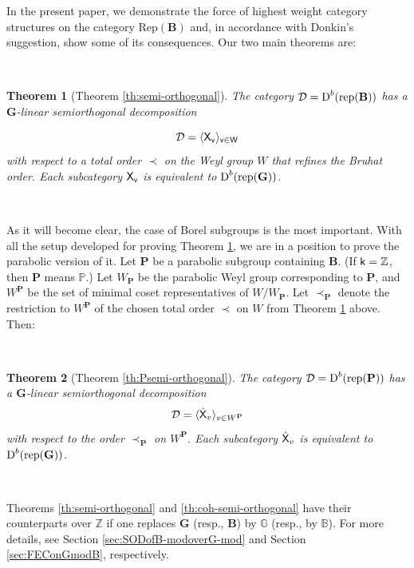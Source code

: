 \documentclass[sn-mathphys-num]{sn-jnl}%
\newcommand{\D}{\mathcal D}
\newcommand{\rep}{{\mathrm{rep}}}
\newcommand{\Rep}{{\mathrm{Rep}}}
\newcommand*{\Dd}{\mathop{\mathrm D\kern0pt}\nolimits}
\newcommand{\sk}{{\sf k}}
\newcommand{\Gm}{\mathbb G}
\newcommand{\Bm}{\mathbb B}
\newcommand{\Z}{{\mathbb Z}}
\newcommand{\bg}{\mathbf G}
\newcommand{\fb}{\mathbf B}
\newcommand{\bp}{\mathbf P}
\newtheorem{theorem}{Theorem}[section]
\theoremstyle{definition}
\begin{document}
In the present paper, we demonstrate the force of highest weight category structures on the category $\Rep(\fb)$ and, in accordance with Donkin's suggestion, show some of its consequences. Our two main theorems are:

\

\begin{theorem}[Theorem \ref{th:semi-orthogonal}]\label{th:1}
The category $\D=\Dd^b (\rep ({\fb}))$ has a $ \bg$-linear semiorthogonal decomposition 

\begin{equation}
\D= \langle \sf X _v\rangle _{v\in W}
\end{equation}
with respect to  a total order $\prec$ on the Weyl group $W$ that refines the Bruhat order. Each subcategory $\sf X _v$ is equivalent to $\Dd ^b(\rep( \bg))$.
\end{theorem}

\

As it will become clear, the case of Borel subgroups is the most important. With all the setup developed for proving Theorem \ref{th:1}, we are in a position to prove the parabolic version of it. Let $\bp$ be a parabolic subgroup containing $\fb$. (If $\sk=\Z$, then $\bp$ means $\mathbb P$.) Let $W_\bp$ be the parabolic Weyl group corresponding to $\bp$, and $W^\bp$ be the set of minimal coset representatives of $W/W_\bp$. Let $\prec _{\bp}$ denote the restriction to $W^\bp$ of the chosen total order $\prec$ on $W$ from Theorem \ref{th:1} above. Then:

\

\begin{theorem}[Theorem \ref{th:Psemi-orthogonal}]\label{th:2}
The category $\D=\Dd^b (\rep ({\bp}))$ has a $ \bg$-linear semiorthogonal decomposition 
\begin{equation}
\D= \langle {\hat{\sf X}} _v\rangle _{v\in W^\bp}
\end{equation}
with respect to the order $\prec _{\bp}$ on  $W^\bp$. Each subcategory ${\hat{\sf X}} _v$ is equivalent to $\Dd ^b(\rep( \bg))$.
\end{theorem}

\

Theorems \ref{th:semi-orthogonal} and \ref{th:coh-semi-orthogonal} have their counterparts over $\mathbb Z$ if one replaces $\bg$ (resp., $\fb$) by $\Gm$ (resp., by $\Bm$). For more details, see Section \ref{sec:SODofB-modoverG-mod} and Section \ref{sec:FEConGmodB}, respectively.
\end{document}
